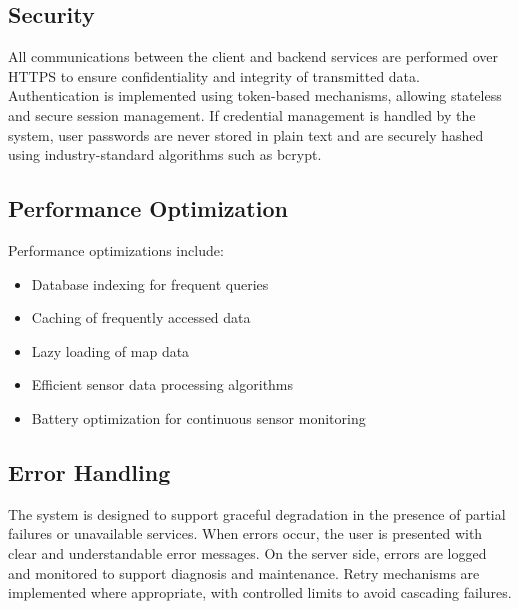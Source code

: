 \subsection{Security}

All communications between the client and backend services are performed over HTTPS to ensure confidentiality and integrity of transmitted data. Authentication is implemented using token-based mechanisms, allowing stateless and secure session management. If credential management is handled by the system, user passwords are never stored in plain text and are securely hashed using industry-standard algorithms such as bcrypt.

\subsection{Performance Optimization}
Performance optimizations include:
\begin{itemize}
    \item Database indexing for frequent queries
    \item Caching of frequently accessed data
    \item Lazy loading of map data
    \item Efficient sensor data processing algorithms
    \item Battery optimization for continuous sensor monitoring
\end{itemize}

\subsection{Error Handling}

The system is designed to support graceful degradation in the presence of partial failures or unavailable services. When errors occur, the user is presented with clear and understandable error messages. On the server side, errors are logged and monitored to support diagnosis and maintenance. Retry mechanisms are implemented where appropriate, with controlled limits to avoid cascading failures.

